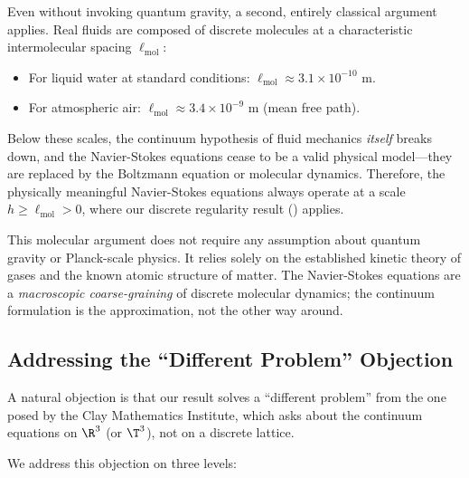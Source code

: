 \documentclass[12pt, a4paper]{article}
\theoremstyle{plain}
\theoremstyle{definition}
\begin{document}
Even without invoking quantum gravity, a second, entirely classical argument
applies. Real fluids are composed of discrete molecules at a characteristic
intermolecular spacing $\ell_{\text{mol}}$:
\begin{itemize}
  \item For liquid water at standard conditions:
    $\ell_{\text{mol}} \approx 3.1 \times 10^{-10}$ m.
  \item For atmospheric air:
    $\ell_{\text{mol}} \approx 3.4 \times 10^{-9}$ m (mean free path).
\end{itemize}
Below these scales, the continuum hypothesis of fluid mechanics
\emph{itself} breaks down, and the Navier-Stokes equations cease to be a
valid physical model---they are replaced by the Boltzmann equation or
molecular dynamics. Therefore, the physically meaningful Navier-Stokes
equations always operate at a scale $h \geq \ell_{\text{mol}} > 0$,
where our discrete regularity result () applies.

\begin{remark}
  This molecular argument does not require any assumption about quantum
  gravity or Planck-scale physics. It relies solely on the established
  kinetic theory of gases \citep{ChorinMarsden1993} and the known atomic
  structure of matter. The Navier-Stokes equations are a \emph{macroscopic
  coarse-graining} of discrete molecular dynamics; the continuum formulation
  is the approximation, not the other way around.
\end{remark}

\subsection{Addressing the ``Different Problem'' Objection}\label{subsec:objection}

A natural objection is that our result solves a ``different problem'' from the
one posed by the Clay Mathematics Institute, which asks about the continuum
equations on $\R^3$ (or $\T^3$), not on a discrete lattice.

We address this objection on three levels:
\end{document}
